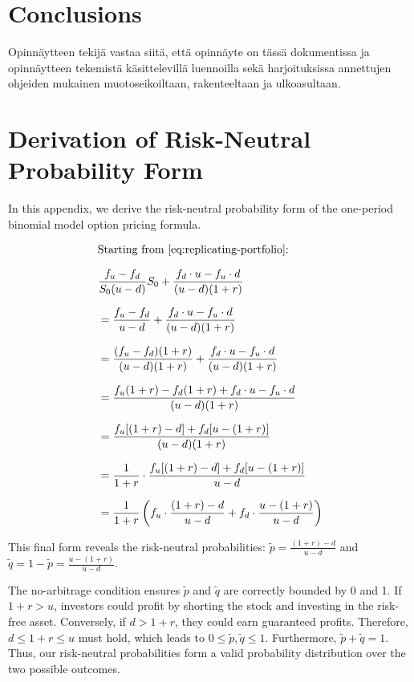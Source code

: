 \documentclass[english,12pt,a4paper,pdftex,sci,utf8]{aaltothesis}
\begin{document}
\section{Conclusions}  \label{sec:conclusions}


Opinn\"aytteen tekij\"a vastaa siit\"a, ett\"a opinn\"ayte on t\"ass\"a dokumentissa
ja opinn\"aytteen tekemist\"a k\"asittelevill\"a luennoilla sek\"a
harjoituksissa annettujen ohjeiden mukainen muotoseikoiltaan,
rakenteeltaan ja ulkoasultaan.\cite{grochowski2004best}


\cleardoublepage

\appendix
\section{Derivation of Risk-Neutral Probability Form}  %
\label{appendix:risk_neutral_derivation}

In this appendix, we derive the risk-neutral probability form of the one-period binomial model option pricing formula.

\begin{align}
&\text{Starting from \eqref{eq:replicating-portfolio}:} \nonumber\\[0.7em]
&\frac{f_u - f_d}{S_0(u-d)}S_0 + \frac{f_d \cdot u-f_u \cdot d}{(u-d)(1+r)} \nonumber\\[0.7em]
&=\frac{f_u - f_d}{u-d} + \frac{f_d \cdot u-f_u \cdot d}{(u-d)(1+r)} \nonumber\\[0.7em]
&=\frac{(f_u - f_d)(1+r)}{(u-d)(1+r)} + \frac{f_d \cdot u - f_u \cdot d}{(u-d)(1+r)} \nonumber\\[0.7em]
&=\frac{f_u(1+r) - f_d(1+r) + f_d \cdot u - f_u \cdot d}{(u-d)(1+r)} \nonumber\\[0.7em]
&= \frac{f_u[(1+r) - d] + f_d[u - (1+r)]}{(u-d)(1+r)} \nonumber\\[0.7em]
&= \frac{1}{1+r} \cdot \frac{f_u[(1+r) - d] + f_d[u - (1+r)]}{u-d} \nonumber\\[0.7em]
&= \frac{1}{1+r} \left( f_u \cdot \frac{(1+r) - d}{u-d} + f_d \cdot \frac{u - (1+r)}{u-d} \right)\nonumber
\end{align}

This final form reveals the risk-neutral probabilities: $\tilde p = \frac{(1+r) - d}{u-d}$ and $\tilde q = 1-\tilde p = \frac{u - (1+r)}{u-d}$.

The no-arbitrage condition ensures $\tilde p$ and $\tilde q$ are correctly bounded by 0 and 1. If $1+r > u$, investors could profit by shorting the stock and investing in the risk-free asset. Conversely, if $d > 1+r$, they could earn guaranteed profits. Therefore, $d \leq 1+r \leq u$ must hold, which leads to $0\leq \tilde p, \tilde q \leq 1$. Furthermore, $\tilde p + \tilde q = 1$. Thus, our risk-neutral probabilities form a valid probability distribution over the two possible outcomes.






\end{document}
